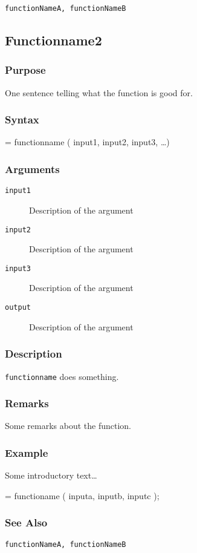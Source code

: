 \documentclass[a4paper]{refrep}
\begin{document}
\texttt{functionNameA, functionNameB}


\clearpage


\subsection{Functionname2}

\subsubsection{Purpose}

One sentence telling what the function is good for.


\subsubsection{Syntax}

\begin{example}
[ output ] = functionname ( input1, input2, input3, \ldots ) 
\end{example}


\subsubsection{Arguments}

\begin{description}
  \item[\texttt{input1}] Description of the argument 
  \item[\texttt{input2}] Description of the argument 
  \item[\texttt{input3}] Description of the argument 
  \item[\texttt{output}] Description of the argument 
\end{description}


\subsubsection{Description}

\texttt{functionname} does something.


\subsubsection{Remarks}

Some remarks about the function.


\subsubsection{Example}

Some introductory text\ldots

\begin{example}
  [ output ] = functioname ( inputa, inputb, inputc ); 
\end{example}


\subsubsection{See Also}

\texttt{functionNameA, functionNameB}


\end{document}
